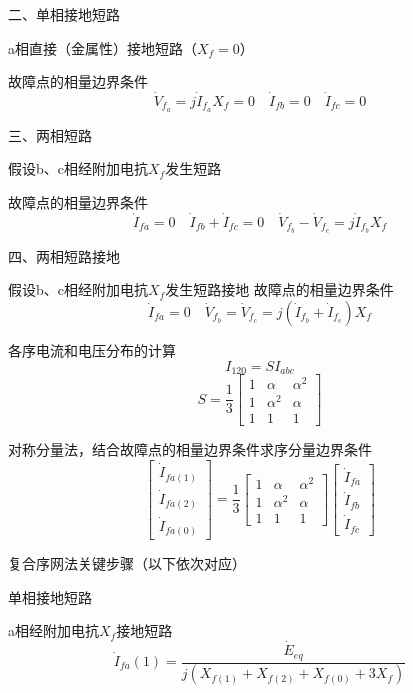 \documentclass[UTF8, 12pt, a4paper]{ctexart}
\begin{document}
二、单相接地短路

a相直接（金属性）接地短路（$X_f=0$）

故障点的相量边界条件
\[ \dot { V } _ { f _ { a } } = j \dot { I } _ { f _ { a } } X _ { f } = 0\quad \dot { I } _ { f b } = 0\quad \dot { I } _ { f c } = 0 \]

三、两相短路

假设b、c相经附加电抗$X_f$发生短路

故障点的相量边界条件
\[ \dot { I } _ { f a } = 0\quad \dot { I } _ { f b } +     \dot { I } _ { f c } = 0\quad \dot { V } _ { f _ { b } } - \dot { V } _ { f _ { c } } = j \dot { I } _ { f _ { b } } X _ { f } \]

四、两相短路接地

假设b、c相经附加电抗$X_f$发生短路接地
故障点的相量边界条件
\[ \dot { I } _ { f a } = 0\quad \dot { V } _ { f _ { b } } = \dot { V } _ { f _ { c } } = j ( \dot { I } _ { f _ { b } } + \dot { I } _ { f _ { c } } ) X _ { f } \]

各序电流和电压分布的计算
\[I_{120}=SI_{abc}\]
\[
    S=
    \frac13\begin{bmatrix}
        1 &  \alpha & \alpha ^2     \\
        1&  \alpha ^2&\alpha \\
        1&  1& 1
    \end{bmatrix} 
\]

对称分量法，结合故障点的相量边界条件求序分量边界条件
\[
    \begin{bmatrix}
        \dot {I}_{fa(1)}\\
        \dot {I}_{fa(2)}\\
        \dot {I}_{fa(0)}
    \end{bmatrix}=
    \frac13\begin{bmatrix}
        1 &  \alpha & \alpha ^2\\
        1&  \alpha ^2&\alpha \\
        1&  1& 1
    \end{bmatrix} 
    \begin{bmatrix}
        \dot {I}_{fa}\\
        \dot {I}_{fb} \\
        \dot {I}_{fc}
    \end{bmatrix}
\]

复合序网法关键步骤（以下依次对应）


单相接地短路

a相经附加电抗$X_f$接地短路
\[ \dot { I } _ { f a } ( 1 ) = \frac { \dot{E} _ { e q } } { j ( X _ { f ( 1 ) } +  X _ { f ( 2 ) } +  X _ { f ( 0 ) } +3 X _ {  f  } ) }\]
\end{document}
